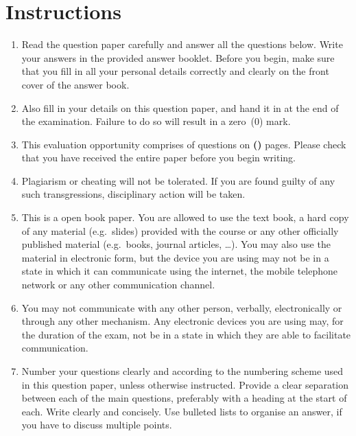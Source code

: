 
\section*{Instructions}
\begin{enumerate}
	\item Read the question paper carefully and answer all the questions below. Write your answers in the provided answer booklet. Before you begin, make sure that you fill in all your personal details correctly and clearly on the front cover of the answer book.
	
	\item Also fill in your details on this question paper, and hand it in at the end of the examination. Failure to do so will result in a zero~(0) mark.
	
	\item This evaluation opportunity comprises of \textbf{\numquestions} questions on \textbf{(\numpages)} pages. Please check that you have received the entire paper before you begin writing.
	      
	\item Plagiarism or cheating will not be tolerated. If you are found guilty of any such transgressions, disciplinary action will be taken.
	
	\item This is a open book paper. You are allowed to use the text book, a hard copy of any material (e.g.\ slides) provided with the course or any other officially published material (e.g.\ books, journal articles, \ldots). You may also use the material in electronic form, but the device you are using may not be in a state in which it can communicate using the internet, the mobile telephone network or any other communication channel.
	
	\item You may not communicate with any other person, verbally, electronically or through any other mechanism. Any electronic devices you are using may, for the duration of the exam, not be in a state in which they are able to facilitate communication. 
	
	\item Number your questions clearly and according to the numbering scheme used in this question paper, unless otherwise instructed. Provide a clear separation between each of the main questions, preferably with a heading at the start of each. Write clearly and concisely. Use bulleted lists to organise an answer, if you have to discuss multiple points. 
\end{enumerate}
